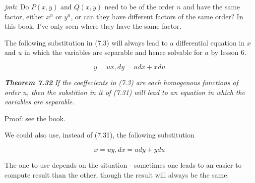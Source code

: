 \documentclass{article}
\begin{document}
\emph{jmh}: Do $P(x,y)$ and $Q(x,y)$ need to be of the order $n$ and have the same factor, either $x^n$ or $y^n$, or can they have different factors of the same order? In this book, I've only seen where they have the same factor.

The following substitution in (7.3) will always lead to a differential equation in $x$ and $u$ in which the variables are separable and hence solvable for $u$ by lesson 6.

\[ y = ux, dy = udx + xdu \tag{7.31} \]

\emph{\textbf{Theorem 7.32}}
\emph{If the coeffecients in (7.3) are each homogenous functions of order n, then the substition in it of (7.31) will lead to an equation in which the variables are separable.}

Proof: see the book.

We could also use, instead of (7.31), the following substitution

\[ x = uy, dx = udy + ydu \tag{7.33} \]

The one to use depends on the situation - sometimes one leads to an easier to compute result than the other, though the result will always be the same.
\end{document}
